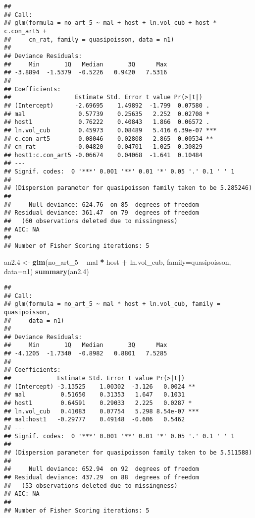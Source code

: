 \documentclass[]{article}
\newenvironment{Shaded}{\begin{snugshade}}{\end{snugshade}}
\newcommand{\KeywordTok}[1]{\textcolor[rgb]{0.13,0.29,0.53}{\textbf{#1}}}
\newcommand{\DataTypeTok}[1]{\textcolor[rgb]{0.13,0.29,0.53}{#1}}
\newcommand{\DecValTok}[1]{\textcolor[rgb]{0.00,0.00,0.81}{#1}}
\newcommand{\StringTok}[1]{\textcolor[rgb]{0.31,0.60,0.02}{#1}}
\newcommand{\OperatorTok}[1]{\textcolor[rgb]{0.81,0.36,0.00}{\textbf{#1}}}
\newcommand{\NormalTok}[1]{#1}
\begin{document}
\begin{verbatim}
## 
## Call:
## glm(formula = no_art_5 ~ mal + host + ln.vol_cub + host * c.con_art5 + 
##     cn_rat, family = quasipoisson, data = n1)
## 
## Deviance Residuals: 
##     Min       1Q   Median       3Q      Max  
## -3.8894  -1.5379  -0.5226   0.9420   7.5316  
## 
## Coefficients:
##                  Estimate Std. Error t value Pr(>|t|)    
## (Intercept)      -2.69695    1.49892  -1.799  0.07580 .  
## mal               0.57739    0.25635   2.252  0.02708 *  
## host1             0.76222    0.40843   1.866  0.06572 .  
## ln.vol_cub        0.45973    0.08489   5.416 6.39e-07 ***
## c.con_art5        0.08046    0.02808   2.865  0.00534 ** 
## cn_rat           -0.04820    0.04701  -1.025  0.30829    
## host1:c.con_art5 -0.06674    0.04068  -1.641  0.10484    
## ---
## Signif. codes:  0 '***' 0.001 '**' 0.01 '*' 0.05 '.' 0.1 ' ' 1
## 
## (Dispersion parameter for quasipoisson family taken to be 5.285246)
## 
##     Null deviance: 624.76  on 85  degrees of freedom
## Residual deviance: 361.47  on 79  degrees of freedom
##   (60 observations deleted due to missingness)
## AIC: NA
## 
## Number of Fisher Scoring iterations: 5
\end{verbatim}

\begin{Shaded}
\begin{Highlighting}[]
\NormalTok{an2.}\DecValTok{4}\NormalTok{ <-}\StringTok{ }\KeywordTok{glm}\NormalTok{(no_art_}\DecValTok{5} \OperatorTok{~}\StringTok{ }\NormalTok{mal }\OperatorTok{*}\StringTok{ }\NormalTok{host }\OperatorTok{+}\StringTok{ }\NormalTok{ln.vol_cub, }\DataTypeTok{family=}\NormalTok{quasipoisson, }\DataTypeTok{data=}\NormalTok{n1)}
\KeywordTok{summary}\NormalTok{(an2.}\DecValTok{4}\NormalTok{)}
\end{Highlighting}
\end{Shaded}

\begin{verbatim}
## 
## Call:
## glm(formula = no_art_5 ~ mal * host + ln.vol_cub, family = quasipoisson, 
##     data = n1)
## 
## Deviance Residuals: 
##     Min       1Q   Median       3Q      Max  
## -4.1205  -1.7340  -0.8982   0.8801   7.5285  
## 
## Coefficients:
##             Estimate Std. Error t value Pr(>|t|)    
## (Intercept) -3.13525    1.00302  -3.126   0.0024 ** 
## mal          0.51650    0.31353   1.647   0.1031    
## host1        0.64591    0.29033   2.225   0.0287 *  
## ln.vol_cub   0.41083    0.07754   5.298 8.54e-07 ***
## mal:host1   -0.29777    0.49148  -0.606   0.5462    
## ---
## Signif. codes:  0 '***' 0.001 '**' 0.01 '*' 0.05 '.' 0.1 ' ' 1
## 
## (Dispersion parameter for quasipoisson family taken to be 5.511588)
## 
##     Null deviance: 652.94  on 92  degrees of freedom
## Residual deviance: 437.29  on 88  degrees of freedom
##   (53 observations deleted due to missingness)
## AIC: NA
## 
## Number of Fisher Scoring iterations: 5
\end{verbatim}
\end{document}
